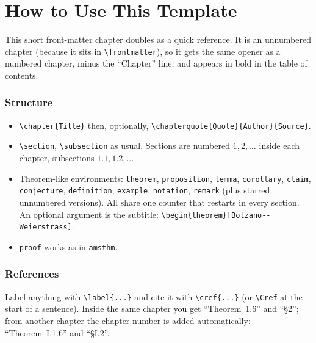 \chapter{How to Use This Template}

This short front-matter chapter doubles as a quick reference. It is an
unnumbered chapter (because it sits in \verb|\frontmatter|), so it gets the
same opener as a numbered chapter, minus the ``Chapter'' line, and appears
in bold in the table of contents.

\subsection*{Structure}
\begin{itemize}[leftmargin=1.5em]
  \item \verb|\chapter{Title}| then, optionally,
        \verb|\chapterquote{Quote}{Author}{Source}|.
  \item \verb|\section|, \verb|\subsection| as usual. Sections are numbered
        $1, 2, \dots$ inside each chapter, subsections $1.1, 1.2, \dots$
  \item Theorem-like environments: \texttt{theorem}, \texttt{proposition},
        \texttt{lemma}, \texttt{corollary}, \texttt{claim},
        \texttt{conjecture}, \texttt{definition}, \texttt{example},
        \texttt{notation}, \texttt{remark} (plus starred, unnumbered
        versions). All share one counter that restarts in every section.
        An optional argument is the subtitle:
        \verb|\begin{theorem}[Bolzano--Weierstrass]|.
  \item \texttt{proof} works as in \texttt{amsthm}.
\end{itemize}

\subsection*{References}
Label anything with \verb|\label{...}| and cite it with \verb|\cref{...}|
(or \verb|\Cref| at the start of a sentence). Inside the same chapter you get
``Theorem~1.6'' and ``\S2''; from another chapter the chapter number is
added automatically: ``Theorem~I.1.6'' and ``\S I.2''.

